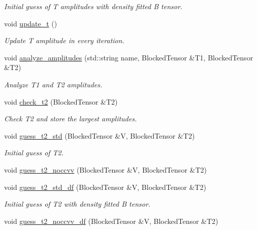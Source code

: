 \begin{DoxyCompactItemize}
\begin{DoxyCompactList}\small\item\em Initial guess of T amplitudes with density fitted B tensor. \end{DoxyCompactList}\item 
void \mbox{\hyperlink{classforte_1_1_m_r_d_s_r_g_ad21e29809e23e544c5e01923bc2be7c1}{update\+\_\+t}} ()
\begin{DoxyCompactList}\small\item\em Update T amplitude in every iteration. \end{DoxyCompactList}\item 
void \mbox{\hyperlink{classforte_1_1_m_r_d_s_r_g_a4a905c057fc43f8c07728fbf2c5d0700}{analyze\+\_\+amplitudes}} (std\+::string name, Blocked\+Tensor \&T1, Blocked\+Tensor \&T2)
\begin{DoxyCompactList}\small\item\em Analyze T1 and T2 amplitudes. \end{DoxyCompactList}\item 
void \mbox{\hyperlink{classforte_1_1_m_r_d_s_r_g_a8490e696406fe44dfe74e6a1cdf4d837}{check\+\_\+t2}} (Blocked\+Tensor \&T2)
\begin{DoxyCompactList}\small\item\em Check T2 and store the largest amplitudes. \end{DoxyCompactList}\item 
void \mbox{\hyperlink{classforte_1_1_m_r_d_s_r_g_a3b886b732fb444027c06e80d1f44c330}{guess\+\_\+t2\+\_\+std}} (Blocked\+Tensor \&V, Blocked\+Tensor \&T2)
\begin{DoxyCompactList}\small\item\em Initial guess of T2. \end{DoxyCompactList}\item 
void \mbox{\hyperlink{classforte_1_1_m_r_d_s_r_g_a914c1514776ee92213f3aec078c2f64b}{guess\+\_\+t2\+\_\+noccvv}} (Blocked\+Tensor \&V, Blocked\+Tensor \&T2)
\item 
void \mbox{\hyperlink{classforte_1_1_m_r_d_s_r_g_a651d68d9309967311a41a9e6962df0c8}{guess\+\_\+t2\+\_\+std\+\_\+df}} (Blocked\+Tensor \&V, Blocked\+Tensor \&T2)
\begin{DoxyCompactList}\small\item\em Initial guess of T2 with density fitted B tensor. \end{DoxyCompactList}\item 
void \mbox{\hyperlink{classforte_1_1_m_r_d_s_r_g_ae4c2beaae974b74ce8634f67699a581c}{guess\+\_\+t2\+\_\+noccvv\+\_\+df}} (Blocked\+Tensor \&V, Blocked\+Tensor \&T2)

\end{DoxyCompactItemize}
